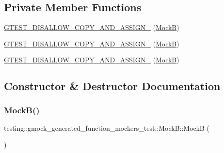 \subsection*{Private Member Functions}
\begin{DoxyCompactItemize}
\item 
\mbox{\hyperlink{classtesting_1_1gmock__generated__function__mockers__test_1_1_mock_b_ac4962d81dca6390be86f8de44cecff06}{G\+T\+E\+S\+T\+\_\+\+D\+I\+S\+A\+L\+L\+O\+W\+\_\+\+C\+O\+P\+Y\+\_\+\+A\+N\+D\+\_\+\+A\+S\+S\+I\+G\+N\+\_\+}} (\mbox{\hyperlink{classtesting_1_1gmock__generated__function__mockers__test_1_1_mock_b}{MockB}})
\item 
\mbox{\hyperlink{classtesting_1_1gmock__generated__function__mockers__test_1_1_mock_b_ac4962d81dca6390be86f8de44cecff06}{G\+T\+E\+S\+T\+\_\+\+D\+I\+S\+A\+L\+L\+O\+W\+\_\+\+C\+O\+P\+Y\+\_\+\+A\+N\+D\+\_\+\+A\+S\+S\+I\+G\+N\+\_\+}} (\mbox{\hyperlink{classtesting_1_1gmock__generated__function__mockers__test_1_1_mock_b}{MockB}})
\item 
\mbox{\hyperlink{classtesting_1_1gmock__generated__function__mockers__test_1_1_mock_b_ac4962d81dca6390be86f8de44cecff06}{G\+T\+E\+S\+T\+\_\+\+D\+I\+S\+A\+L\+L\+O\+W\+\_\+\+C\+O\+P\+Y\+\_\+\+A\+N\+D\+\_\+\+A\+S\+S\+I\+G\+N\+\_\+}} (\mbox{\hyperlink{classtesting_1_1gmock__generated__function__mockers__test_1_1_mock_b}{MockB}})
\end{DoxyCompactItemize}


\subsection{Constructor \& Destructor Documentation}
\mbox{\label{classtesting_1_1gmock__generated__function__mockers__test_1_1_mock_b_a74072ea75eb47e4e91e40151396014a1}} 
\subsubsection{\texorpdfstring{MockB()}{MockB()}\hspace{0.1cm}{\footnotesize\ttfamily [1/3]}}
{\footnotesize\ttfamily testing\+::gmock\+\_\+generated\+\_\+function\+\_\+mockers\+\_\+test\+::\+Mock\+B\+::\+MockB (\begin{DoxyParamCaption}{ }\end{DoxyParamCaption})\hspace{0.3cm}{\ttfamily [inline]}}


